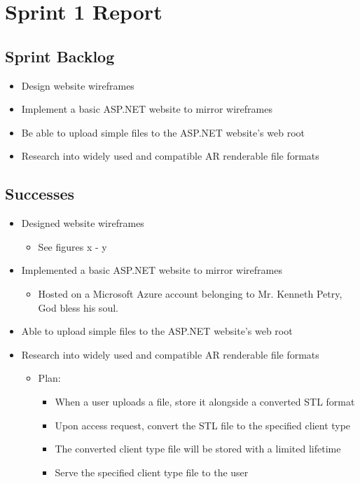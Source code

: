
\section{Sprint 1 Report}
\label{sec:Sprint1_report}
    \subsection{Sprint Backlog}
    \label{sec:Sprint1_backlog}
    \begin{itemize}
        \item Design website wireframes 
        \item Implement a basic ASP.NET website to mirror wireframes
        \item Be able to upload simple files to the ASP.NET website's web root
        \item Research into widely used and compatible AR renderable file formats
    \end{itemize}

    \subsection{Successes}
    \label{sec:Sprint1_successes}
        \begin{itemize}
            \item Designed website wireframes
                \begin{itemize}
                    \item See figures x - y %
                \end{itemize}
            \item Implemented a basic ASP.NET website to mirror wireframes
                \begin{itemize}
                    \item Hosted on a Microsoft Azure account belonging to Mr. Kenneth Petry, God bless his soul.
                \end{itemize}
            \item Able to upload simple files to the ASP.NET website's web root
            \item Research into widely used and compatible AR renderable file formats
                \begin{itemize}
                    \item Plan:
                        \begin{itemize}
                            \item When a user uploads a file, store it alongside a converted STL format
                            \item Upon access request, convert the STL file to the specified client type
                            \item The converted client type file will be stored with a limited lifetime
                            \item Serve the specified client type file to the user
                        \end{itemize}
                \end{itemize}
        \end{itemize}
